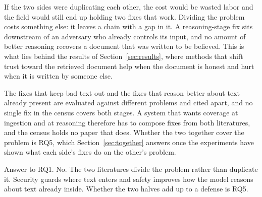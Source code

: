 If the two sides were duplicating each other, the cost would be wasted
labor and the field would still end up holding two fixes that work.
Dividing the problem costs something else: it leaves a chain with a gap in
it. A reasoning-stage fix sits downstream of an adversary who already
controls its input, and no amount of better reasoning recovers a document
that was written to be believed. This is what lies behind the results of
Section~\ref{sec:results}, where methods
that shift trust toward the retrieved document help when the document is
honest and hurt when it is written by someone else.

The fixes that keep bad text out and the fixes that reason better about
text already present are evaluated against different problems and cited
apart, and no single fix in the census covers both stages. A system that wants coverage at ingestion and at
reasoning therefore has to compose fixes from both literatures, and the
census holds no paper that does. Whether the two together cover the problem
is RQ5, which Section~\ref{sec:together} answers once the experiments have
shown what each side's fixes do on the other's problem.

Answer to RQ1. No. The two literatures divide the problem rather than
duplicate it. Security guards where text enters and safety improves how the
model reasons about text already inside. Whether the two halves add up to a
defense is RQ5.
